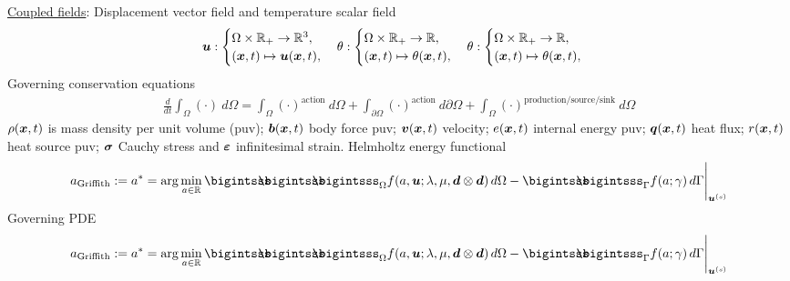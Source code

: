\documentclass[25pt, a0paper,
portrait,
margin=2mm, 
innermargin=2mm, 
blockverticalspace=7mm, %
colspace=2mm, %
subcolspace=0mm]{tikzposter}
\begin{document}
{
	\begin{minipage}{0.43\textwidth}
		\begin{mdframed}
			\underline{Coupled fields}: Displacement vector field and temperature scalar field
			\begin{align*}
				{\boldsymbol{\mathnormal u}}:
				\begin{cases}
					\Omega \times \mathbb{R}_{+} \rightarrow \mathbb{R}^3, \\
					({\boldsymbol{\mathnormal x}},t) \mapsto {\boldsymbol{\mathnormal u}}({\boldsymbol{\mathnormal x}},t),
				\end{cases}
				\theta:
				\begin{cases}
					\Omega \times \mathbb{R}_{+} \rightarrow \mathbb{R}, \\
					({\boldsymbol{\mathnormal x}},t) \mapsto \theta({\boldsymbol{\mathnormal x}},t),
				\end{cases}
				\theta:
				\begin{cases}
					\Omega \times \mathbb{R}_{+} \rightarrow \mathbb{R}, \\
					({\boldsymbol{\mathnormal x}},t) \mapsto \theta({\boldsymbol{\mathnormal x}},t),
				\end{cases}
			\end{align*}
			Governing conservation equations
			\begin{align*}
				\frac{d}{dt} \int_{\Omega}(\cdot)\ d\Omega = \int_{\Omega}(\cdot)^{\text{action}}\ d\Omega 
				+ \int_{\partial\Omega}(\cdot)^{\text{action}}\ d\partial\Omega  
				+ \int_{\Omega}(\cdot)^{\text{production/source/sink}}\ d\Omega
			\end{align*}
			$\rho({\boldsymbol{\mathnormal x}},t)$ is mass density per unit volume (puv); 
			${\boldsymbol{\mathnormal b}}({\boldsymbol{\mathnormal x}},t)$ body force puv; 
			${\boldsymbol{\mathnormal v}}({\boldsymbol{\mathnormal x}},t)$ velocity; 
			$e({\boldsymbol{\mathnormal x}},t)$ internal energy puv; 
			${\boldsymbol{\mathnormal q}}({\boldsymbol{\mathnormal x}},t)$ heat flux; 
			$r({\boldsymbol{\mathnormal x}},t)$ heat source puv; 
			${\boldsymbol{\sigma}}$ Cauchy stress and 
			${\boldsymbol{\varepsilon}}$ infinitesimal strain.
			Helmholtz energy functional 
			\begin{align*}
				a_{\text{Griffith}} := a^{*} = \arg\min_{a\in\mathbb{R}}{\bigintsss\!\!\!\!\!\!\bigintsss\!\!\!\!\!\!\bigintsss_{\Omega} f(a,\bm{u};\lambda,\mu,\bm{d}\otimes\bm{d}) \, d\Omega - \bigintsss\!\!\!\!\!\!\bigintsss_{\Gamma} f(a;\gamma) \, d\Gamma}\Bigg|_{\bm{u}^{(s)}}
			\end{align*}
			Governing PDE
			\begin{align*}
				a_{\text{Griffith}} := a^{*} = \arg\min_{a\in\mathbb{R}}{\bigintsss\!\!\!\!\!\!\bigintsss\!\!\!\!\!\!\bigintsss_{\Omega} f(a,\bm{u};\lambda,\mu,\bm{d}\otimes\bm{d}) \, d\Omega - \bigintsss\!\!\!\!\!\!\bigintsss_{\Gamma} f(a;\gamma) \, d\Gamma}\Bigg|_{\bm{u}^{(s)}}

\end{align*}
\end{mdframed}
\end{minipage}}
\end{document}
